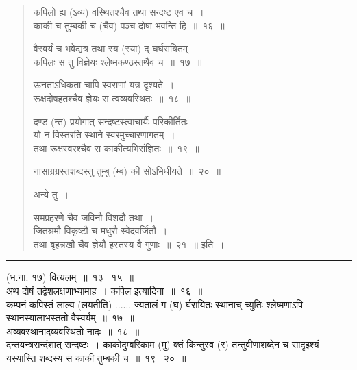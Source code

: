\documentclass[11pt, openany]{book}
\begin{document}
\newpage

\begin{quote}
{\na कपिलो ह्य (ऽव्य) वस्थितश्चैव तथा सन्दष्ट एव च~।\\
 काकी च तुम्बकी च (चैव) पञ्च दोषा भवन्ति हि~॥~१६~॥

 वैस्वर्यं च भवेद्यत्र तथा स्य (स्या) द् घर्घरायितम्~।\\
 कपिलः स तु विज्ञेयः श्लेष्मकण्ठस्तथैव च~॥~१७~॥

 ऊनताऽधिकता चापि स्वराणां यत्र दृश्यते~।\\
 रूक्षदोषहतश्चैव ज्ञेयः स त्वव्यवस्थितः~॥~१८~॥

 दण्ड (न्त) प्रयोगात् सन्दष्टस्त्वाचार्यैः परिकीर्तितः~।\\
 यो न विस्तरति स्थाने स्वरमुच्चारणागतम्~।\\
 तथा रूक्षस्वरश्चैव स काकीत्यभिसंज्ञितः~॥~१९~॥

 नासाग्रग्रस्तशब्दस्तु तुम्बु (म्ब) की सोऽभिधीयते~॥~२०~॥}

अन्ये तु~। 

 {\na समप्रहरणे चैव जविनौ विशदौ तथा~।\\
 जितश्रमौ विकृष्टौ च मधुरौ स्वेदवर्जितौ~।\\
 तथा बृहन्नखौ चैव ज्ञेयौ हस्तस्य वै गुणाः~॥~२१~॥} इति~।
\end{quote}

\hrule

\vspace{2mm}
(भ.ना. १७) वित्यलम्~॥~१३ \textendash\ १५~॥\\

अथ दोषं तद्वेशलक्षणाभ्यामाह~। {\qtt कपिल} इत्यादिना~॥~१६~॥\\

कम्पनं कपिस्तं लाल्य (लयतीति) ...... ज्यतालं {\qtt ग (घ) र्घरायितः} स्थानाच् च्युतिः श्लेष्मणाऽपि स्थानस्यालाभस्ततो वैस्वर्यम्~॥~१७~॥\\

अव्यवस्थानादव्यवस्थितो नादः~॥~१८~॥\\

दन्तयन्त्रसन्दंशात् {\qtt सन्दष्टः}~। काकोदुम्बरिकाम (मु) क्तं किन्तुस्व (र) तन्तुवीणाशब्देन च सादृइश्यं यस्यास्ति शब्दस्य स काकी तुम्बकी च~॥~१९ \textendash\ २०~॥

\newpage
\end{document}
